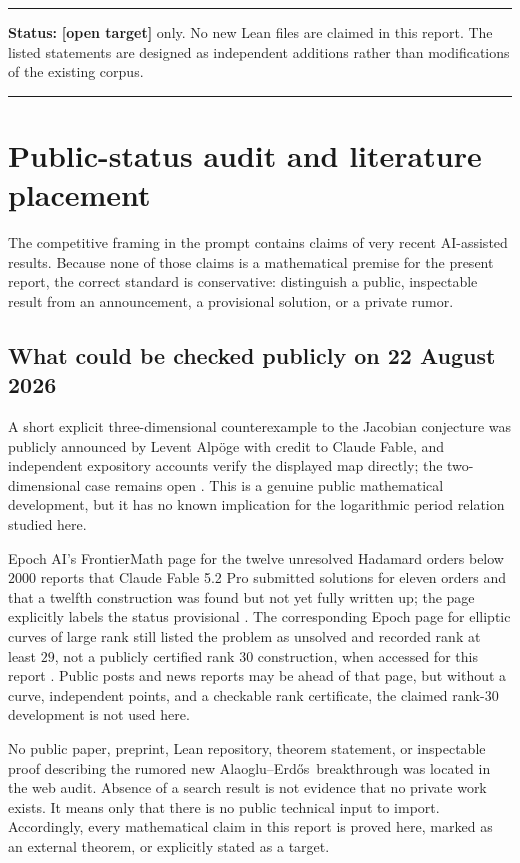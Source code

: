 \documentclass[11pt,oneside]{article}
\theoremstyle{definition}
\theoremstyle{remark}
\newcommand{\AEname}{Alaoglu--Erd\H{o}s}
\newcommand{\statustarget}{\textcolor{targetviolet}{\textbf{[open target]}}}
\newenvironment{statusbox}[1]
{\begin{center}\begin{minipage}{0.94\textwidth}\raggedright\hrule\vspace{0.45em}
\textbf{Status:} #1\par\vspace{0.35em}}
{\vspace{0.35em}\hrule\end{minipage}\end{center}}
\begin{document}
\begin{statusbox}{\statustarget{} only.  No new Lean files are claimed in this report.  The
listed statements are designed as independent additions rather than modifications of the
existing corpus.}
\end{statusbox}

\section{Public-status audit and literature placement}
\label{sec:public-audit}

The competitive framing in the prompt contains claims of very recent AI-assisted results.
Because none of those claims is a mathematical premise for the present report, the correct
standard is conservative: distinguish a public, inspectable result from an announcement, a
provisional solution, or a private rumor.

\subsection{What could be checked publicly on 22 August 2026}

A short explicit three-dimensional counterexample to the Jacobian conjecture was publicly
announced by Levent Alp\"oge with credit to Claude Fable, and independent expository accounts
verify the displayed map directly; the two-dimensional case remains open
\cite{TaoJacobian2026,GaoJacobian2026}.  This is a genuine public mathematical
development, but it has no known implication for the logarithmic period relation studied here.

Epoch AI's FrontierMath page for the twelve unresolved Hadamard orders below $2000$ reports
that Claude Fable 5.2 Pro submitted solutions for eleven orders and that a twelfth construction
was found but not yet fully written up; the page explicitly labels the status provisional
\cite{EpochHadamard2026}.  The corresponding Epoch page for elliptic curves of large rank still
listed the problem as unsolved and recorded rank at least $29$, not a publicly certified rank
$30$ construction, when accessed for this report \cite{EpochElliptic2026}.  Public posts and
news reports may be ahead of that page, but without a curve, independent points, and a
checkable rank certificate, the claimed rank-$30$ development is not used here.

No public paper, preprint, Lean repository, theorem statement, or inspectable proof describing
the rumored new \AEname\ breakthrough was located in the web audit.  Absence of a search result is
not evidence that no private work exists.  It means only that there is no public technical
input to import.  Accordingly, every mathematical claim in this report is proved here, marked
as an external theorem, or explicitly stated as a target.
\end{document}

